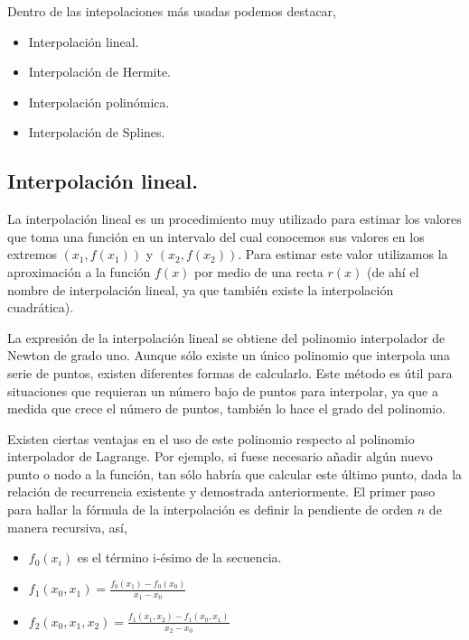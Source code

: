\newpage

\hspace{0.4cm} Dentro de las intepolaciones m\'as usadas podemos destacar,

\begin{itemize}
  \item Interpolaci\'on lineal.
  \item Interpolaci\'on de Hermite.
  \item Interpolaci\'on polin\'omica.
  \item Interpolaci\'on de Splines.

\end{itemize}

\subsection{Interpolaci\'on lineal.\\}

\hspace{0.4cm} La interpolaci\'on lineal es un procedimiento muy utilizado para estimar los valores que toma una funci\'on en un intervalo del cual conocemos sus valores en los extremos $(x_{1}, f(x_{1}))$ y $(x_{2},f(x_{2}))$. Para estimar este valor utilizamos la aproximaci\'on a la funci\'on $f(x)$ por medio de una recta $r(x)$ (de ah\'i el nombre de interpolaci\'on lineal, ya que tambi\'en existe la interpolaci\'on cuadr\'atica). 


\hspace{0.4cm} La expresi\'on de la interpolaci\'on lineal se obtiene del polinomio interpolador de Newton de grado uno. Aunque s\'olo existe un \'unico polinomio que interpola una serie de puntos, existen diferentes formas de calcularlo. Este m\'etodo es \'util para situaciones que requieran un n\'umero bajo de puntos para interpolar, ya que a medida que crece el n\'umero de puntos, tambi\'en lo hace el grado del polinomio.

\hspace{0.4cm} Existen ciertas ventajas en el uso de este polinomio respecto al polinomio interpolador de Lagrange. Por ejemplo, si fuese necesario a\~nadir alg\'un nuevo punto o nodo a la funci\'on, tan s\'olo habr\'ia que calcular este \'ultimo punto, dada la relaci\'on de recurrencia existente y demostrada anteriormente. El primer paso para hallar la f\'ormula de la interpolaci\'on es definir la pendiente de orden $n$ de manera recursiva, as\'i,

\begin{itemize}
  \item $f_{0}(x_{i})$ es el t\'ermino i-\'esimo de la secuencia. 
  \item $\displaystyle{f_{1}(x_{0},x_{1}) = \frac{f_{0}(x_{1})-f_{0}(x_{0})}{x_{1}-x_{0}}}$
  \item $\displaystyle{f_{2}(x_{0},x_{1},x_{2}) = \frac{f_{1}(x_{1},x_{2})-f_{1}(x_{0},x_{1})}{x_{2}-x_{0}}}$
\end{itemize}

